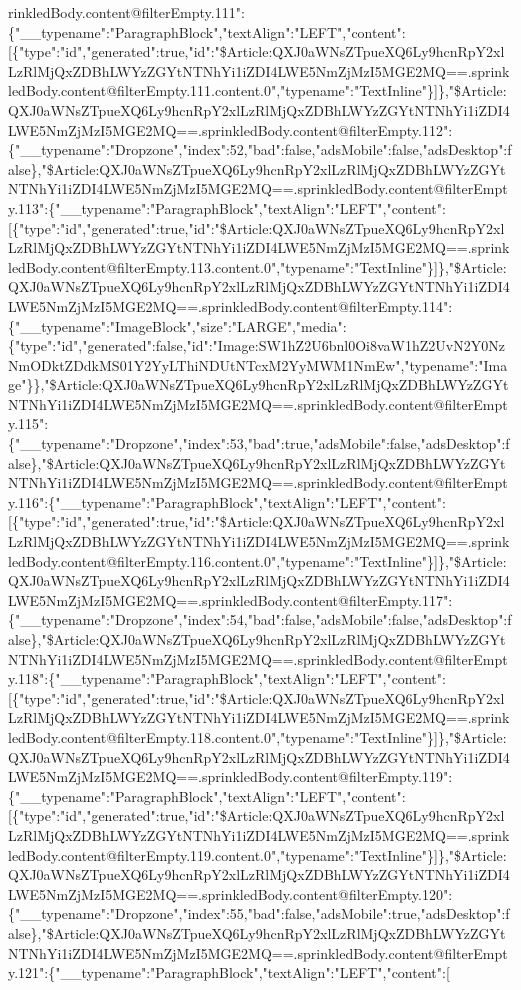 rinkledBody.content@filterEmpty.111":\{"\_\_typename":"ParagraphBlock","textAlign":"LEFT","content":{[}\{"type":"id","generated":true,"id":"\$Article:QXJ0aWNsZTpueXQ6Ly9hcnRpY2xlLzRlMjQxZDBhLWYzZGYtNTNhYi1iZDI4LWE5NmZjMzI5MGE2MQ==.sprinkledBody.content@filterEmpty.111.content.0","typename":"TextInline"\}{]}\},"\$Article:QXJ0aWNsZTpueXQ6Ly9hcnRpY2xlLzRlMjQxZDBhLWYzZGYtNTNhYi1iZDI4LWE5NmZjMzI5MGE2MQ==.sprinkledBody.content@filterEmpty.112":\{"\_\_typename":"Dropzone","index":52,"bad":false,"adsMobile":false,"adsDesktop":false\},"\$Article:QXJ0aWNsZTpueXQ6Ly9hcnRpY2xlLzRlMjQxZDBhLWYzZGYtNTNhYi1iZDI4LWE5NmZjMzI5MGE2MQ==.sprinkledBody.content@filterEmpty.113":\{"\_\_typename":"ParagraphBlock","textAlign":"LEFT","content":{[}\{"type":"id","generated":true,"id":"\$Article:QXJ0aWNsZTpueXQ6Ly9hcnRpY2xlLzRlMjQxZDBhLWYzZGYtNTNhYi1iZDI4LWE5NmZjMzI5MGE2MQ==.sprinkledBody.content@filterEmpty.113.content.0","typename":"TextInline"\}{]}\},"\$Article:QXJ0aWNsZTpueXQ6Ly9hcnRpY2xlLzRlMjQxZDBhLWYzZGYtNTNhYi1iZDI4LWE5NmZjMzI5MGE2MQ==.sprinkledBody.content@filterEmpty.114":\{"\_\_typename":"ImageBlock","size":"LARGE","media":\{"type":"id","generated":false,"id":"Image:SW1hZ2U6bnl0Oi8vaW1hZ2UvN2Y0NzNmODktZDdkMS01Y2YyLThiNDUtNTcxM2YyMWM1NmEw","typename":"Image"\}\},"\$Article:QXJ0aWNsZTpueXQ6Ly9hcnRpY2xlLzRlMjQxZDBhLWYzZGYtNTNhYi1iZDI4LWE5NmZjMzI5MGE2MQ==.sprinkledBody.content@filterEmpty.115":\{"\_\_typename":"Dropzone","index":53,"bad":true,"adsMobile":false,"adsDesktop":false\},"\$Article:QXJ0aWNsZTpueXQ6Ly9hcnRpY2xlLzRlMjQxZDBhLWYzZGYtNTNhYi1iZDI4LWE5NmZjMzI5MGE2MQ==.sprinkledBody.content@filterEmpty.116":\{"\_\_typename":"ParagraphBlock","textAlign":"LEFT","content":{[}\{"type":"id","generated":true,"id":"\$Article:QXJ0aWNsZTpueXQ6Ly9hcnRpY2xlLzRlMjQxZDBhLWYzZGYtNTNhYi1iZDI4LWE5NmZjMzI5MGE2MQ==.sprinkledBody.content@filterEmpty.116.content.0","typename":"TextInline"\}{]}\},"\$Article:QXJ0aWNsZTpueXQ6Ly9hcnRpY2xlLzRlMjQxZDBhLWYzZGYtNTNhYi1iZDI4LWE5NmZjMzI5MGE2MQ==.sprinkledBody.content@filterEmpty.117":\{"\_\_typename":"Dropzone","index":54,"bad":false,"adsMobile":false,"adsDesktop":false\},"\$Article:QXJ0aWNsZTpueXQ6Ly9hcnRpY2xlLzRlMjQxZDBhLWYzZGYtNTNhYi1iZDI4LWE5NmZjMzI5MGE2MQ==.sprinkledBody.content@filterEmpty.118":\{"\_\_typename":"ParagraphBlock","textAlign":"LEFT","content":{[}\{"type":"id","generated":true,"id":"\$Article:QXJ0aWNsZTpueXQ6Ly9hcnRpY2xlLzRlMjQxZDBhLWYzZGYtNTNhYi1iZDI4LWE5NmZjMzI5MGE2MQ==.sprinkledBody.content@filterEmpty.118.content.0","typename":"TextInline"\}{]}\},"\$Article:QXJ0aWNsZTpueXQ6Ly9hcnRpY2xlLzRlMjQxZDBhLWYzZGYtNTNhYi1iZDI4LWE5NmZjMzI5MGE2MQ==.sprinkledBody.content@filterEmpty.119":\{"\_\_typename":"ParagraphBlock","textAlign":"LEFT","content":{[}\{"type":"id","generated":true,"id":"\$Article:QXJ0aWNsZTpueXQ6Ly9hcnRpY2xlLzRlMjQxZDBhLWYzZGYtNTNhYi1iZDI4LWE5NmZjMzI5MGE2MQ==.sprinkledBody.content@filterEmpty.119.content.0","typename":"TextInline"\}{]}\},"\$Article:QXJ0aWNsZTpueXQ6Ly9hcnRpY2xlLzRlMjQxZDBhLWYzZGYtNTNhYi1iZDI4LWE5NmZjMzI5MGE2MQ==.sprinkledBody.content@filterEmpty.120":\{"\_\_typename":"Dropzone","index":55,"bad":false,"adsMobile":true,"adsDesktop":false\},"\$Article:QXJ0aWNsZTpueXQ6Ly9hcnRpY2xlLzRlMjQxZDBhLWYzZGYtNTNhYi1iZDI4LWE5NmZjMzI5MGE2MQ==.sprinkledBody.content@filterEmpty.121":\{"\_\_typename":"ParagraphBlock","textAlign":"LEFT","content":{[}\